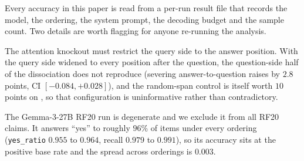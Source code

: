 Every accuracy in this paper is read from a per-run result file that records the
model, the ordering, the system prompt, the decoding budget and the sample count.
Two details are worth flagging for anyone re-running the analysis.

The attention knockout must restrict the query side to the answer position. With
the query side widened to every position after the question, the question-side
half of the dissociation does not reproduce (severing answer-to-question raises
\sit{} by $2.8$ points, CI $[-0.084, +0.028]$), and the random-span control is
itself worth $10$ points on \sti{}, so that configuration is uninformative rather
than contradictory.

The Gemma-3-27B RF20 run is degenerate and we exclude it from all RF20 claims.
It answers ``yes'' to roughly $96\%$ of items under every ordering
(\texttt{yes\_ratio} $0.955$ to $0.964$, recall $0.979$ to $0.991$), so its
accuracy sits at the positive base rate and the spread across orderings is
$0.003$.
